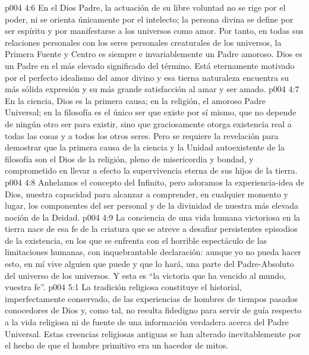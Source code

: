 \vs p004 4:6 En el Dios Padre, la actuación de su libre voluntad no se rige por el poder, ni se orienta únicamente por el intelecto; la persona divina se define por ser espíritu y por manifestarse a los universos como amor. Por tanto, en todas sus relaciones personales con los seres personales creaturales de los universos, la Primera Fuente y Centro es siempre e invariablemente un Padre amoroso. Dios es un Padre en el más elevado significado del término. Está eternamente motivado por el perfecto idealismo del amor divino y esa tierna naturaleza encuentra su más sólida expresión y su más grande satisfacción al amar y ser amado.
\vs p004 4:7 \pc En la ciencia, Dios es la primera causa; en la religión, el amoroso Padre Universal; en la filosofía es el único ser que existe por sí mismo, que no depende de ningún otro ser para existir, sino que graciosamente otorga existencia real a todas las cosas y a todos los otros seres. Pero se requiere la revelación para demostrar que la primera causa de la ciencia y la Unidad autoexistente de la filosofía son el Dios de la religión, pleno de misericordia y bondad, y comprometido en llevar a efecto la supervivencia eterna de sus hijos de la tierra.
\vs p004 4:8 Anhelamos el concepto del Infinito, pero adoramos la experiencia\hyp{}idea de Dios, nuestra capacidad para alcanzar a comprender, en cualquier momento y lugar, los componentes del ser personal y de la divinidad de nuestra más elevada noción de la Deidad.
\vs p004 4:9 La conciencia de una vida humana victoriosa en la tierra nace de esa fe de la criatura que se atreve a desafiar persistentes episodios de la existencia, en los que se enfrenta con el horrible espectáculo de las limitaciones humanas, con inquebrantable declaración: aunque yo no pueda hacer esto, en mí vive alguien que puede y que lo hará, una parte del Padre\hyp{}Absoluto del universo de los universos. Y esta es “la victoria que ha vencido al mundo, vuestra fe”.
\vs p004 5:1 La tradición religiosa constituye el historial, imperfectamente conservado, de las experiencias de hombres de tiempos pasados conocedores de Dios y, como tal, no resulta fidedigno para servir de guía respecto a la vida religiosa ni de fuente de una información verdadera acerca del Padre Universal. Estas creencias religiosas antiguas se han alterado inevitablemente por el hecho de que el hombre primitivo era un hacedor de mitos.
